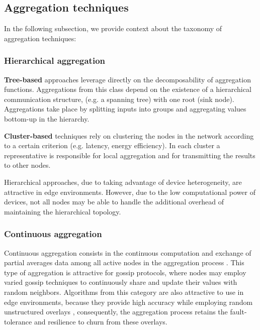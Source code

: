 \subsection{Aggregation techniques}

In the following subsection, we provide context about the taxonomy of aggregation techniques:

\subsubsection*{Hierarchical aggregation}

\textbf{Tree-based} approaches leverage directly on the decomposability of aggregation functions. Aggregations from this class depend on the existence of a hierarchical communication structure, (e.g. a spanning tree) with one root (sink node). Aggregations take place by splitting inputs into groups and aggregating values bottom-up in the hierarchy. 


\textbf{Cluster-based} techniques rely on clustering the nodes in the network according to a certain criterion (e.g. latency, energy efficiency). In each cluster a representative is responsible for local aggregation and for transmitting the results to other nodes. 

Hierarchical approaches, due to taking advantage of device heterogeneity, are attractive in edge environments. However, due to the low computational power of devices, not all nodes may be able to handle the additional overhead of maintaining the hierarchical topology.

\subsubsection*{Continuous aggregation}

Continuous aggregation consists in the continuous computation and exchange of partial averages data among all active nodes in the aggregation process  \cite{8613952}. This type of aggregation is attractive for gossip protocols, where nodes may employ varied gossip techniques to continuously share and update their values with random neighbors. Algorithms from this category are also attractive to use in edge environments, because they provide high accuracy while employing random unstructured overlays \cite{gossip_aggregation}, consequently, the aggregation process retains the fault-tolerance and resilience to churn from these overlays.

